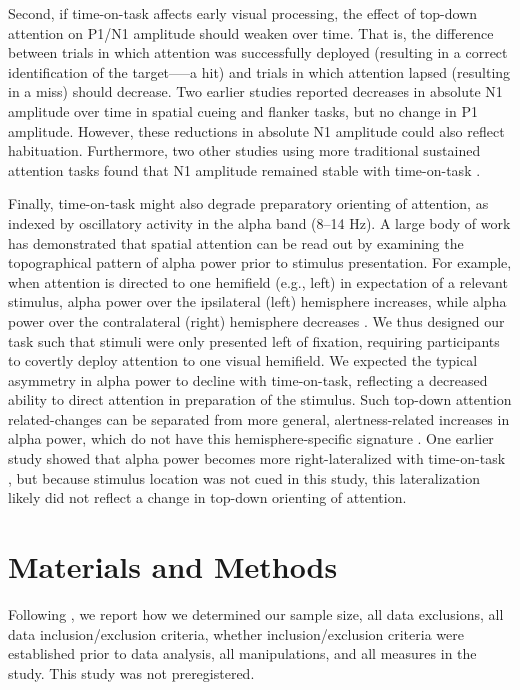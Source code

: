 \documentclass[11pt,]{memoir}
\begin{document}
Second, if time-on-task affects early visual processing, the effect of top-down attention on P1/N1 amplitude should weaken over time. That is, the difference between trials in which attention was successfully deployed (resulting in a correct identification of the target-----a hit) and trials in which attention lapsed (resulting in a miss) should decrease. Two earlier studies reported decreases in absolute N1 amplitude over time in spatial cueing \autocite{Boksem2005} and flanker \autocite{Faber2012} tasks, but no change in P1 amplitude. However, these reductions in absolute N1 amplitude could also reflect habituation. Furthermore, two other studies using more traditional sustained attention tasks found that N1 amplitude remained stable with time-on-task \autocites{Bonnefond2010}{Koelega1992}.

Finally, time-on-task might also degrade preparatory orienting of attention, as indexed by oscillatory activity in the alpha band (8--14 Hz). A large body of work has demonstrated that spatial attention can be read out by examining the topographical pattern of alpha power prior to stimulus presentation. For example, when attention is directed to one hemifield (e.g., left) in expectation of a relevant stimulus, alpha power over the ipsilateral (left) hemisphere increases, while alpha power over the contralateral (right) hemisphere decreases \autocites{Sauseng2005}{Thut2006}{Worden2000}. We thus designed our task such that stimuli were only presented left of fixation, requiring participants to covertly deploy attention to one visual hemifield. We expected the typical asymmetry in alpha power to decline with time-on-task, reflecting a decreased ability to direct attention in preparation of the stimulus. Such top-down attention related-changes can be separated from more general, alertness-related increases in alpha power, which do not have this hemisphere-specific signature \autocites{Cajochen1995}{Drapeau2004}. One earlier study showed that alpha power becomes more right-lateralized with time-on-task \autocite{Newman2013}, but because stimulus location was not cued in this study, this lateralization likely did not reflect a change in top-down orienting of attention.

\hypertarget{MFBrain-methods}{%
\section{Materials and Methods}\label{MFBrain-methods}}

Following \textcite{Simmons2012}, we report how we determined our sample size, all data exclusions, all data inclusion/exclusion criteria, whether inclusion/exclusion criteria were established prior to data analysis, all manipulations, and all measures in the study. This study was not preregistered.
\end{document}
